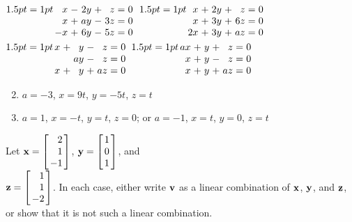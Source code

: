 \begin{multicols}{2}
\begin{ex}
\begin{exenumerate}
\exitem 
$\arraycolsep=1pt
\begin{array}[t]{rlrlrcr}
	 x & - & 2y & + &  z & = & 0 \\
	 x & + & ay & - & 3z & = & 0 \\
	-x & + & 6y & - & 5z & = & 0 \\
\end{array}$
\exitem 
$\arraycolsep=1pt
\begin{array}[t]{rlrlrcr}
	x & + & 2y & + &  z & = & 0 \\
	x & + & 3y & + & 6z & = & 0 \\
	2x & + & 3y & + & az & = & 0 \\
\end{array}$
\exitem 
$\arraycolsep=1pt
\begin{array}[t]{rlrlrcr}
	x & + &  y & - &  z & = & 0 \\
	  &   & ay & - &  z & = & 0 \\
	 x & + &  y & + & az & = & 0 \\
\end{array}$
\exitem 
$\arraycolsep=1pt
\begin{array}[t]{rlrlrcr}
	ax & + &  y & + &  z & = & 0 \\
	x & + &  y & - &  z & = & 0 \\
	 x & + &  y & + & az & = & 0 \\
\end{array}$
\end{exenumerate}
\begin{sol}
\begin{enumerate}[label={\alph*.}]
\setcounter{enumi}{1}
\item  $a = -3$, $x = 9t$, $y = -5t$, $z = t$

\setcounter{enumi}{3}
\item  $a = 1$, $x = -t$, $y = t$, $z = 0$; or $a = -1$, $x = t$, $y = 0$, $z = t$

\end{enumerate}
\end{sol}
\end{ex}

\begin{ex}
Let $\vect{x} = 
\leftB \begin{array}{r}
	2 \\
	1 \\
	-1
\end{array} \rightB$, $\vect{y} = 
\leftB \begin{array}{r}
	1 \\
	0 \\
	1
\end{array} \rightB$, and \\ $\vect{z} = 
\leftB \begin{array}{r}
	1 \\
	1 \\
	-2
\end{array} \rightB$. In each case, either write $\textbf{v}$ as a linear combination of $\textbf{x}$, $\textbf{y}$, and $\textbf{z}$, or show that it is not such a linear combination.


\end{ex}
\end{multicols}
